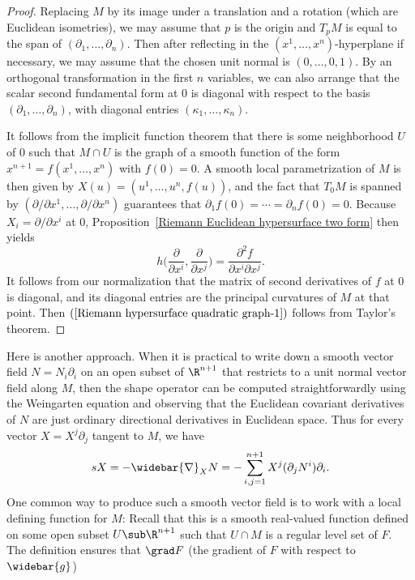 \begin{proof}
Replacing $M$ by its image under a translation and a rotation (which are Euclidean isometries), we may assume that $p$ is the origin and $T_pM$ is equal to the span of $(\partial_1,\dots,\partial_n)$. 
Then after reflecting in the $(x^1,\dots,x^n)$-hyperplane if necessary, we may assume that the chosen unit normal is $(0,\dots,0,1)$. By an orthogonal transformation in 
the first $n$ variables, we can also arrange that the scalar second fundamental form at $0$ is diagonal with respect to the basis $(\partial_1,\dots,\partial_n)$, with 
diagonal entries $(\kappa_1,\dots,\kappa_n)$.\par
It follows from the implicit function theorem that there is some neighborhood $U$ of $0$ such that $M\cap U$ is the graph of a smooth function of the form $x^{n+1}=f(x^1,\dots,x^n)$ 
with $f(0)=0$. A smooth local parametrization of $M$ is then given by $X(u)=(u^1,\dots,u^n,f(u))$, and the fact that $T_0M$ is spanned by $(\partial/\partial x^1,\dots,\partial/\partial x^n)$ 
guarantees that $\partial_1f(0)=\cdots=\partial_nf(0)=0$. Because $X_i=\partial/\partial x^i$ at $0$, Proposition~\ref{Riemann Euclidean hypersurface two form} then 
yields
\[h\Big(\frac{\partial}{\partial x^i},\frac{\partial}{\partial x^j}\Big)=\frac{\partial^2f}{\partial x^i\partial x^j}.\]
It follows from our normalization that the matrix of second derivatives of $f$ at $0$ is diagonal, and its diagonal entries are the principal curvatures of $M$ at that 
point. Then $(\ref{Riemann hypersurface quadratic graph-1})$ follows from Taylor's theorem.
\end{proof}
Here is another approach. When it is practical to write down a smooth vector field $N=N_i\partial_i$ on an open subset of $\R^{n+1}$ that restricts to a unit normal 
vector field along $M$, then the shape operator can be computed straightforwardly using the Weingarten equation and observing that the Euclidean covariant derivatives 
of $N$ are just ordinary directional derivatives in Euclidean space. Thus for every vector $X=X^j\partial_j$ tangent to $M$, we have
\begin{align}\label{Riemann Euclidean hypersurface shape perator}
sX=-\widebar{\nabla}_XN=-\sum_{i,j=1}^{n+1}X^j(\partial_jN^i)\partial_i.
\end{align}
One common way to produce such a smooth vector field is to work with a local defining function for $M$: Recall that this is a smooth real-valued function defined on some 
open subset $U\sub\R^{n+1}$ such that $U\cap M$ is a regular level set of $F$. The definition ensures that $\grad F$ (the gradient of $F$ with respect to $\widebar{g}$) 
